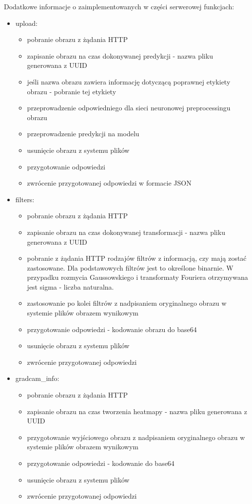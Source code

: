 \documentclass[polish,12pt]{aghthesis}
\begin{document}
\par\noindent Dodatkowe informacje o zaimplementowanych w części serwerowej funkcjach:
\begin{itemize}
    \item upload: 
    \begin{itemize}
        \item pobranie obrazu z żądania HTTP
        \item zapisanie obrazu na czas dokonywanej predykcji - nazwa pliku generowana z UUID
        \item jeśli nazwa obrazu zawiera informację dotyczącą poprawnej etykiety obrazu - pobranie tej etykiety
        \item przeprowadzenie odpowiedniego dla sieci neuronowej preprocessingu obrazu
        \item przeprowadzenie predykcji na modelu
        \item usunięcie obrazu z systemu plików
        \item przygotowanie odpowiedzi
        \item zwrócenie przygotowanej odpowiedzi w formacie JSON
    \end{itemize}
    \item filters:
    \begin{itemize}
        \item pobranie obrazu z żądania HTTP
        \item zapisanie obrazu na czas dokonywanej transformacji - nazwa pliku generowana z UUID
        \item pobranie z żądania HTTP rodzajów filtrów z informacją, czy mają zostać zastosowane. Dla podstawowych filtrów jest to określone binarnie. W przypadku rozmycia Gaussowskiego i transformaty Fouriera otrzymywana jest sigma - liczba naturalna. 
        \item zastosowanie po kolei filtrów z nadpisaniem oryginalnego obrazu w systemie plików obrazem wynikowym
        \item przygotowanie odpowiedzi - kodowanie obrazu do base64
        \item usunięcie obrazu z systemu plików
        \item zwrócenie przygotowanej odpowiedzi 
    \end{itemize}
    \item gradcam\_info:
    \begin{itemize}
        \item pobranie obrazu z żądania HTTP
        \item zapisanie obrazu na czas tworzenia heatmapy - nazwa pliku generowana z UUID
        \item przygotowanie wyjściowego obrazu z nadpisaniem oryginalnego obrazu w systemie plików obrazem wynikowym
        \item przygotowanie odpowiedzi - kodowanie do base64
        \item usunięcie obrazu z systemu plików
        \item zwrócenie przygotowanej odpowiedzi 
    \end{itemize}
\end{itemize}
\end{document}
